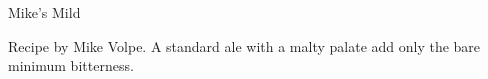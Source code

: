 \begin{recipe}{Mike's Mild}

\begin{aboutblock}
Recipe by Mike Volpe. A standard ale with a malty palate add only the bare
minimum bitterness. 
\end{aboutblock}


\begin{methodandtiming}
 
\begin{mashsteps}
\end{mashsteps}

\begin{fermentationsteps}
\end{fermentationsteps}

\end{methodandtiming}

\recipebreak

\begin{ingredientsblock}

\begin{malts}
\end{malts}

\begin{hops}
\end{hops}


\end{ingredientsblock}

\end{recipe}

